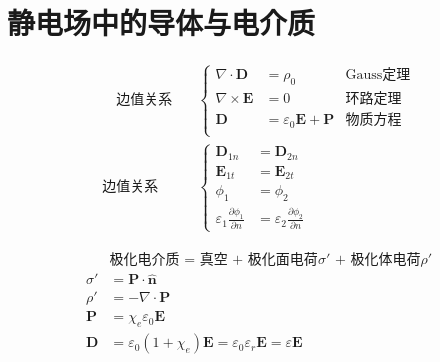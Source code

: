 \documentclass[12pt,onecolumn,a4paper]{book}
\newenvironment{block}[1]{
    \begin{tcolorbox}[colback=blue!5!white,colframe=blue!75!black,title=#1]
}{
    \end{tcolorbox}
}
\numberwithin{table}{subsection}
\numberwithin{equation}{subsection}
\begin{document}
\chapter{静电场中的导体与电介质}

\begin{block}{方程}
    \begin{align}
        \quad
        \text{边值关系} \quad & \left\{
        \begin{aligned}
            \nabla \cdot \mathbf{D}  & = \rho_0                                & \text{Gauss定理} \\
            \nabla \times \mathbf{E} & = 0                                     & \text{环路定理}    \\
            \mathbf{D}               & = \varepsilon_0 \mathbf{E} + \mathbf{P} & \text{物质方程}    \\
        \end{aligned}
        \right.                     \\
        \text{边值关系} \quad
                          & \left\{
        \begin{aligned}
            \mathbf{D}_{1n}                                 & = \mathbf{D}_{2n}                                 \\
            \mathbf{E}_{1t}                                 & = \mathbf{E}_{2t}                                 \\
            \phi_1                                          & =   \phi_2                                        \\
            \varepsilon_1\frac{\partial \phi_1}{\partial n} & = \varepsilon_2\frac{\partial \phi_2}{\partial n}
        \end{aligned}
        \right.
    \end{align}
\end{block}

\begin{block}{电介质}
    \begin{align}
                   & \text{极化电介质 = 真空 + 极化面电荷$\sigma'$ + 极化体电荷$\rho'$}                                                       \\
        \sigma'    & = \mathbf{P} \cdot \hat{\mathbf{n}}                                                                     \\
        \rho'      & = -\nabla \cdot \mathbf{P}                                                                              \\
        \mathbf{P} & = \chi_e \varepsilon_0 \mathbf{E}                                                                       \\
        \mathbf{D} & = \varepsilon_0 (1+\chi_e) \mathbf{E} = \varepsilon_0 \varepsilon_r \mathbf{E} = \varepsilon \mathbf{E}
    \end{align}
\end{block}
\end{document}
